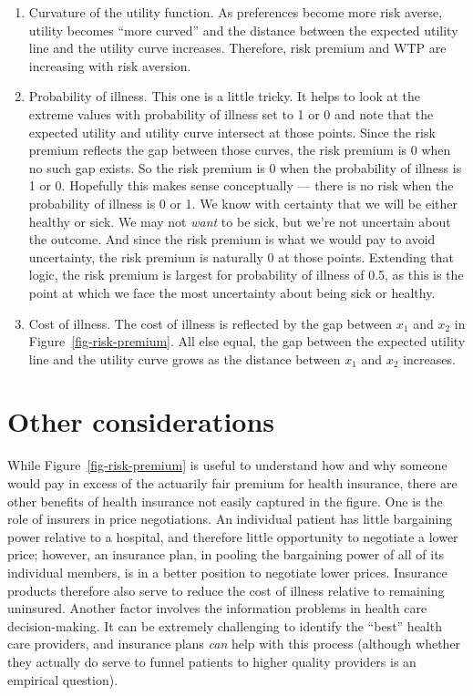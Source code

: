 \documentclass[
  letterpaper,
  DIV=11,
  numbers=noendperiod]{scrreport}
\providecommand{\tightlist}{%
  \setlength{\itemsep}{0pt}\setlength{\parskip}{0pt}}\usepackage{longtable,booktabs,array}
\theoremstyle{definition}
\theoremstyle{remark}
\begin{document}
\begin{enumerate}
\def\labelenumi{\arabic{enumi}.}
\tightlist
\item
  Curvature of the utility function. As preferences become more risk
  averse, utility becomes ``more curved'' and the distance between the
  expected utility line and the utility curve increases. Therefore, risk
  premium and WTP are increasing with risk aversion.
\item
  Probability of illness. This one is a little tricky. It helps to look
  at the extreme values with probability of illness set to 1 or 0 and
  note that the expected utility and utility curve intersect at those
  points. Since the risk premium reflects the gap between those curves,
  the risk premium is 0 when no such gap exists. So the risk premium is
  0 when the probability of illness is 1 or 0. Hopefully this makes
  sense conceptually --- there is no risk when the probability of
  illness is 0 or 1. We know with certainty that we will be either
  healthy or sick. We may not \emph{want} to be sick, but we're not
  uncertain about the outcome. And since the risk premium is what we
  would pay to avoid uncertainty, the risk premium is naturally 0 at
  those points. Extending that logic, the risk premium is largest for
  probability of illness of 0.5, as this is the point at which we face
  the most uncertainty about being sick or healthy.
\item
  Cost of illness. The cost of illness is reflected by the gap between
  \(x_{1}\) and \(x_{2}\) in Figure~\ref{fig-risk-premium}. All else
  equal, the gap between the expected utility line and the utility curve
  grows as the distance between \(x_{1}\) and \(x_{2}\) increases.
\end{enumerate}

\hypertarget{other-considerations}{%
\section{Other considerations}\label{other-considerations}}

While Figure~\ref{fig-risk-premium} is useful to understand how and why
someone would pay in excess of the actuarily fair premium for health
insurance, there are other benefits of health insurance not easily
captured in the figure. One is the role of insurers in price
negotiations. An individual patient has little bargaining power relative
to a hospital, and therefore little opportunity to negotiate a lower
price; however, an insurance plan, in pooling the bargaining power of
all of its individual members, is in a better position to negotiate
lower prices. Insurance products therefore also serve to reduce the cost
of illness relative to remaining uninsured. Another factor involves the
information problems in health care decision-making. It can be extremely
challenging to identify the ``best'' health care providers, and
insurance plans \emph{can} help with this process (although whether they
actually do serve to funnel patients to higher quality providers is an
empirical question).
\end{document}
